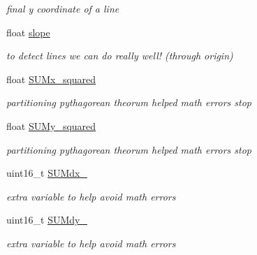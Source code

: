 \begin{DoxyCompactItemize}
\begin{DoxyCompactList}\small\item\em final y coordinate of a line \end{DoxyCompactList}\item 
\hypertarget{classtask__lines_a51332b7495541314d657391dcffd6481}{float \hyperlink{classtask__lines_a51332b7495541314d657391dcffd6481}{slope}}\label{classtask__lines_a51332b7495541314d657391dcffd6481}

\begin{DoxyCompactList}\small\item\em to detect lines we can do really well! (through origin) \end{DoxyCompactList}\item 
\hypertarget{classtask__lines_a2d1f5a2952f88bf379e03ec7bdc4b818}{float \hyperlink{classtask__lines_a2d1f5a2952f88bf379e03ec7bdc4b818}{S\-U\-Mx\-\_\-squared}}\label{classtask__lines_a2d1f5a2952f88bf379e03ec7bdc4b818}

\begin{DoxyCompactList}\small\item\em partitioning pythagorean theorum helped math errors stop \end{DoxyCompactList}\item 
\hypertarget{classtask__lines_a1cc6ee26543dbfe85b3500dfdc1712d1}{float \hyperlink{classtask__lines_a1cc6ee26543dbfe85b3500dfdc1712d1}{S\-U\-My\-\_\-squared}}\label{classtask__lines_a1cc6ee26543dbfe85b3500dfdc1712d1}

\begin{DoxyCompactList}\small\item\em partitioning pythagorean theorum helped math errors stop \end{DoxyCompactList}\item 
\hypertarget{classtask__lines_abc0d3f3dbce125e7b35fc116ecf05350}{uint16\-\_\-t \hyperlink{classtask__lines_abc0d3f3dbce125e7b35fc116ecf05350}{S\-U\-Mdx\-\_}}\label{classtask__lines_abc0d3f3dbce125e7b35fc116ecf05350}

\begin{DoxyCompactList}\small\item\em extra variable to help avoid math errors \end{DoxyCompactList}\item 
\hypertarget{classtask__lines_a29bac5ba1aef89204d59be10188508e8}{uint16\-\_\-t \hyperlink{classtask__lines_a29bac5ba1aef89204d59be10188508e8}{S\-U\-Mdy\-\_}}\label{classtask__lines_a29bac5ba1aef89204d59be10188508e8}

\begin{DoxyCompactList}\small\item\em extra variable to help avoid math errors \end{DoxyCompactList}\end{DoxyCompactItemize}


